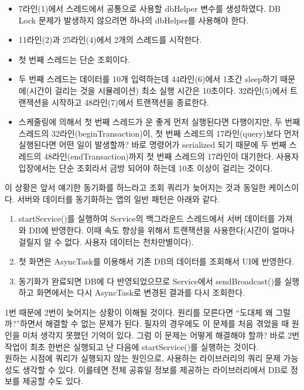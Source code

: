 \begin{itemize}
\item 7라인(1)에서 스레드에서 공통으로 사용할 dbHelper 변수를 생성하였다. DB Lock 문제가 발생하지 않으려면 하나의 dbHelper를 사용해야 한다.
\item 11라인(2)과 25라인(4)에서 2개의 스레드를 시작한다.
\item 첫 번째 스레드는 단순 조회이다.
\item 두 번째 스레드는 데이터를 10개 입력하는데 44라인(6)에서 1초간 sleep하기 때문에(시간이 걸리는 것을 시뮬레이션) 최소 실행 시간은 10초이다. 32라인(5)에서 트랜잭션을 시작하고 48라인(7)에서 트랜잭션을 종료한다.
\item 스케줄링에 의해서 첫 번째 스레드가 운 좋게 먼저 실행된다면 다행이지만, 두 번째 스레드의 32라인(beginTransaction)이, 첫 번째 스레드의 17라인(query)보다 먼저 실행된다면 어떤 일이 발생할까? 바로 명령어가 serialized 되기 때문에 두 번째 스레드의 48라인(endTransaction)까지 첫 번째 스레드의 17라인이 대기한다. 사용자 입장에서는 단순 조회라서 금방 되어야 하는데 10초 이상이 걸리는 것이다. 
\end{itemize}

이 상황은 앞서 얘기한 동기화를 하느라고 조회 쿼리가 늦어지는 것과 동일한 케이스이다. 
서버와 데이터를 동기화하는 앱의 일반 패턴은 아래와 같다.
\begin{enumerate}
\item startService()를 실행하여 Service의 백그라운드 스레드에서 서버 데이터를 가져와 DB에 반영한다. 이때 속도 향상을 위해서 트랜잭션을 사용한다(시간이 얼마나 걸릴지 알 수 없다. 사용자 데이터는 천차만별이다).
\item 첫 화면은 AsyncTask를 이용해서 기존 DB의 데이터를 조회해서 UI에 반영한다. 
\item 동기화가 완료되면 DB에 다 반영되었으므로 Service에서 sendBroadcast()를 실행하고 화면에서는 다시 AsyncTask로 변경된 결과를 다시 조회한다.
\end{enumerate}

1번 때문에 2번이 늦어지는 상황이 이해될 것이다. 원리를 모른다면 ``도대체 왜 그럴까?''하면서 해결할 수 없는 문제가 된다. 
필자의 경우에도 이 문제를 처음 겪었을 때 원인을 미처 생각지 못했던 기억이 있다. 그럼 이 문제는 어떻게 해결해야 할까? 바로 2번 작업이 최초 한번은 실행되고 난 다음에 startService()를 실행하는 것이다.\\

원하는 시점에 쿼리가 실행되지 않는 원인으로, 사용하는 라이브러리의 쿼리 문제 가능성도 생각할 수 있다. 이를테면 전체 공휴일 정보를 제공하는 라이브러리에서 DB로 정보를 제공할 수도 있다.\\

